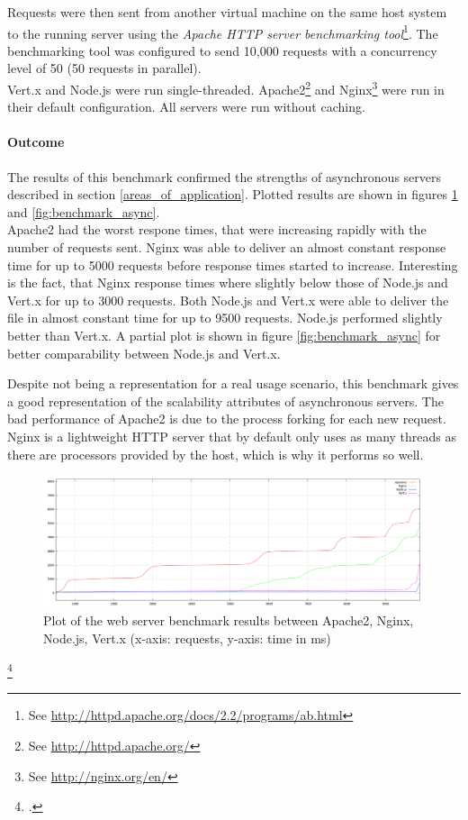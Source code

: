 Requests were then sent from another virtual machine on the same host system 
to the running server using the \textit{Apache HTTP server benchmarking 
tool}\footnote{See \url{http://httpd.apache.org/docs/2.2/programs/ab.html}}.
The benchmarking tool was configured to send 10,000 requests with a concurrency
level of 50 (50 requests in parallel).\\
Vert.x and Node.js were run single-threaded. Apache2\footnote{See \url{http://httpd.apache.org/}} and Nginx\footnote{See \url{http://nginx.org/en/}} were run in their
default configuration. All servers were run without caching.
\paragraph{Outcome} The results of this benchmark confirmed the strengths of asynchronous servers described in section \ref{areas_of_application}.
Plotted results are shown in figures \ref{fig:benchmark_all} and \ref{fig:benchmark_async}.\\
Apache2 had the worst respone times, that were increasing rapidly with the number of requests sent.
Nginx was able to deliver an almost constant response time for up to 5000 requests before response times started to increase.
Interesting is the fact, that Nginx response times where slightly below those of Node.js and Vert.x for up to 3000 requests.
Both Node.js and Vert.x were able to deliver the file in almost constant time for up to 9500 requests. Node.js performed slightly better than
Vert.x. A partial plot is shown in figure \ref{fig:benchmark_async} for better comparability between Node.js and Vert.x.

Despite not being a representation for a real usage scenario, this benchmark
gives a good representation of the scalability attributes of asynchronous 
servers. The bad performance of Apache2 is due to the process forking for each
new request. Nginx is a lightweight HTTP server that by default only uses as
many threads as there are processors provided by the host, which is why it
performs so well.


\begin{figure}[htbp]
\centering
\includegraphics[width=\textwidth]{img/200kb_benchmark.png}
\caption[Plot of the web server benchmark results (all servers)]{Plot of the web server benchmark results between Apache2, Nginx, Node.js, Vert.x (x-axis: requests, y-axis: time in ms)}
\label{fig:benchmark_all}
\end{figure}
\footcitetext{req_res}

